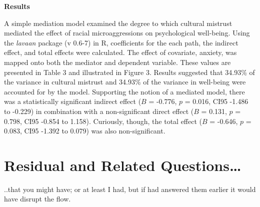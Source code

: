\documentclass[
]{book}
\begin{document}
\textbf{Results}

A simple mediation model examined the degree to which cultural mistrust mediated the effect of racial microaggressions on psychological well-being. Using the \emph{lavaan} package (v 0.6-7) in R, coefficients for the each path, the indirect effect, and total effects were calculated. The effect of covariate, anxiety, was mapped onto both the mediator and dependent variable. These values are presented in Table 3 and illustrated in Figure 3. Results suggested that 34.93\% of the variance in cultural mistrust and 34.93\% of the variance in well-being were accounted for by the model. Supporting the notion of a mediated model, there was a statistically significant indirect effect (\(B\) = -0.776, \(p\) = 0.016, CI95 -1.486 to -0.229) in combination with a non-significant direct effect (\(B\) = 0.131, \(p\) = 0.798, CI95 -0.854 to 1.158). Curiously, though, the total effect (\(B\) = -0.646, \(p\) = 0.083, CI95 -1.392 to 0.079) was also non-significant.

\hypertarget{residual-and-related-questions}{%
\section{Residual and Related Questions\ldots{}}\label{residual-and-related-questions}}

..that you might have; or at least I had, but if had answered them earlier it would have disrupt the flow.
\end{document}
